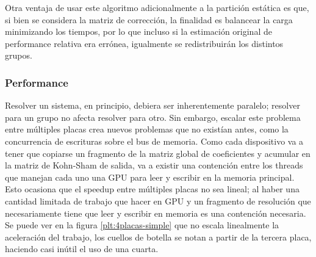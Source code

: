 
Otra ventaja de usar este algoritmo adicionalmente a la partici\'on est\'atica es que, si bien se considera la matriz
de correcci\'on, la finalidad es balancear la carga minimizando los tiempos, por lo que incluso si la estimaci\'on original
de performance relativa era err\'onea, igualmente se redistribuir\'an los distintos grupos.

\subsubsection{Performance}

Resolver un sistema, en principio, debiera ser inherentemente paralelo; resolver para un grupo
no afecta resolver para otro. Sin embargo, escalar este problema entre m\'ultiples placas crea
nuevos problemas que no exist\'ian antes, como la concurrencia de escrituras sobre el bus de memoria.
Como cada dispositivo va a tener que copiarse un fragmento de la matriz global de coeficientes
y acumular en la matriz de Kohn-Sham de salida, va a existir una contenci\'on entre los threads que manejan
cada uno una GPU para leer y escribir en la memoria principal. Esto ocasiona que el speedup entre
m\'ultiples placas no sea lineal; al haber una cantidad limitada de trabajo que hacer en GPU y un fragmento de
resoluci\'on que necesariamente tiene que leer y escribir en memoria es una contenci\'on necesaria. Se puede
ver en la figura \ref{plt:4placas-simple} que no escala linealmente la aceleraci\'on del trabajo, los cuellos
de botella se notan a partir de la tercera placa, haciendo casi in\'util el uso de una cuarta.

